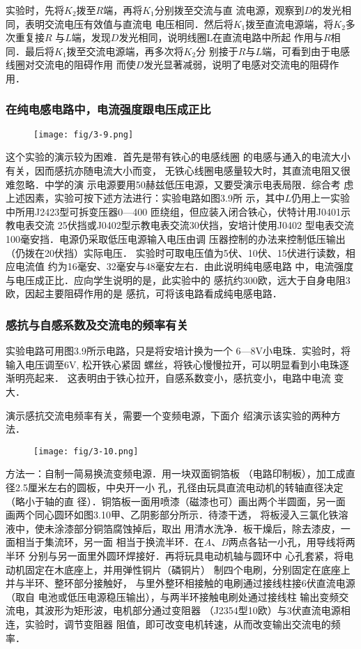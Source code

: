 实验时，先将$K_2$拨至$R$端，再将$K_1$分别拨至交流与直
流电源，观察到$D$的发光相同，表明交流电压有效值与直流电
电压相同．然后将$K_1$拨至直流电源端，将$K_2$多次重复接$R$
与$L$端，发现$D$发光相同，说明线圈L在直流电路中所起
作用与$R$相同．最后将$K_1$拨至交流电源端，再多次将$K_2$分
别接于$R$与$L$端，可看到由于电感线圈对交流电的阻碍作用
而使$D$发光显著减弱，说明了电感对交流电的阻碍作用．

\subsubsection{在纯电感电路中，电流强度跟电压成正比}
\begin{figure}[htp]
    \centering
\texttt{[image: fig/3-9.png]}
    \caption{}
\end{figure}

这个实验的演示较为困难．首先是带有铁心的电感线圈
的电感与通入的电流大小有关，因而感抗亦随电流大小而变，
无铁心线圈电感量较大时，其直流电阻又很难忽略．中学的演
示电源要用50赫兹低压电源，又要受演示电表局限．综合考
虑上述因素，实验可按下述方法进行：实验电路如图3.9所
示，其中$L$仍用上一实验中所用J2423型可拆变压器0—400
匝绕组，但应装入闭合铁心，伏特计用J0401示教电表交流
25伏挡或J0402型示教电表交流30伏挡，安培计使用J0402
型电表交流100毫安挡．电源仍采取低压电源输入电压由调
压器控制的办法来控制低压输出（仍拨在20伏挡）实际电压．
实验时可取电压值为5伏、10伏、15伏进行读数，相应电流值
约为16毫安、32毫安与48毫安左右．由此说明纯电感电路
中，电流强度与电压成正比．应向学生说明的是，此实验中的
感抗约300欧，远大于自身电阻3欧，因起主要阻碍作用的是
感抗，可将该电路看成纯电感电路．

\subsubsection{感抗与自感系数及交流电的频率有关}
实验电路可用图3.9所示电路，只是将安培计换为一个
6—8V小电珠．实验时，将输入电压调至6V, 松开铁心紧固
螺丝，将铁心慢慢拉开，可以明显看到小电珠逐渐明亮起来．
这表明由于铁心拉开，自感系数变小，感抗变小，电路中电流
变大．

演示感抗交流电频率有关，需要一个变频电源，下面介
绍演示该实验的两种方法．

\begin{figure}[htp]
    \centering
\texttt{[image: fig/3-10.png]}
    \caption{}
\end{figure}

方法一：自制一简易换流变频电源．用一块双面铜箔板
（电路印制板），加工成直径2.5厘米左右的圆板，中央开一小
孔，孔径由玩具直流电动机的转轴直径决定（略小于轴的直
径）．铜箔板一面用喷漆（磁漆也可）画出两个半圆面，另一面
画两个同心圆环如图3.10甲、乙阴影部分所示．待漆干透，
将板浸入三氯化铁溶液中，使未涂漆部分铜箔腐蚀掉后，取出
用清水洗净．板干燥后，除去漆皮，一面相当于集流环，另一面
相当于换流半环．在$A$、$B$两点各钻一小孔，用导线将两半环
分别与另一面里外圆环焊接好．再将玩具电动机轴与圆环中
心孔套紧，将电动机固定在木底座上，并用弹性铜片（磷铜片）
制四个电刷，分别固定在底座上并与半环、整环部分接触好，
与里外整环相接触的电刷通过接线柱接6伏直流电源（取自
电池或低压电源稳压输出），与两半环接触电刷处通过接线柱
输出变频交流电，其波形为矩形波，电机部分通过变阻器
（J2354型10欧）与3伏直流电源相连，实验时，调节变阻器
阻值，即可改变电机转速，从而改变输出交流电的频率．

